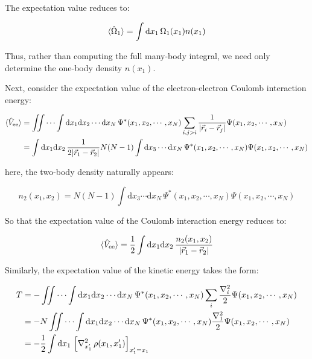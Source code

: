 
The expectation value reduces to:

\begin{equation}
    \braket{\hat\Omega_1}=\int\mathrm{d}x_1\,\Omega_1(x_1)n(x_1)
\label{observables_one-body_density}
\end{equation}

Thus, rather than computing the full many-body integral, we need only determine the one-body density $n(x_1)$.

Next, consider the expectation value of the electron-electron Coulomb interaction energy:

\begin{equation}
\begin{aligned}
    \braket{\hat{V}_\mathrm{ee}}
    &= \iint\cdots\int \mathrm{d}x_1\mathrm{d}x_2\cdots\mathrm{d}x_N\,\Psi^*(x_1,x_2,\cdots,x_N)\sum_{i,j>i}\frac{1}{|\vec{r}_i-\vec{r}_j|}\Psi(x_1,x_2,\cdots,x_N) \\
    &= \int\mathrm{d}x_1\mathrm{d}x_2\,\frac{1}{2|\vec{r}_1-\vec{r}_2|}N(N-1)\int\mathrm{d}x_3\cdots\mathrm{d}x_N\,\Psi^*(x_1,x_2,\cdots,x_N)\Psi(x_1,x_2,\cdots,x_N)
\end{aligned}
\label{coulomb_interaction_energy}
\end{equation}

here, the two-body density naturally appears:

\begin{equation}
    n_2(x_1,x_2)=N(N-1)\int\mathrm{d}x_3\cdots\mathrm{d}x_N\,\Psi^*(x_1,x_2,\cdots,x_N)\Psi(x_1,x_2,\cdots,x_N)
\label{two-body_density}
\end{equation}

So that the expectation value of the Coulomb interaction energy reduces to:

\begin{equation}
    \braket{\hat{V}_\mathrm{ee}}=\frac{1}{2}\int\mathrm{d}x_1\mathrm{d}x_2\,
    \frac{n_2(x_1,x_2)}{|\vec{r}_1-\vec{r}_2|}
\label{observables_two-body_density}
\end{equation}

Similarly, the expectation value of the kinetic energy takes the form:

\begin{equation}
\begin{aligned}
    T
    &= -\iint\cdots\int \mathrm{d}x_1\mathrm{d}x_2\cdots\mathrm{d}x_N\,
    \Psi^*(x_1,x_2,\cdots,x_N)\sum_i\frac{\nabla_i^2}{2}\Psi(x_1,x_2,\cdots,x_N) \\
    &= -N\iint\cdots\int \mathrm{d}x_1\mathrm{d}x_2\cdots\mathrm{d}x_N\,
    \Psi^*(x_1,x_2,\cdots,x_N)\frac{\nabla_1^2}{2}\Psi(x_1,x_2,\cdots,x_N) \\
    &= -\frac{1}{2}\int\mathrm{d}{x_1}\,
    \left[\nabla_{x'_1}^{2}\,\rho(x_1,x'_1)\right]_{x'_1=x_1}
\end{aligned}
\label{kinetic_energy}
\end{equation}

